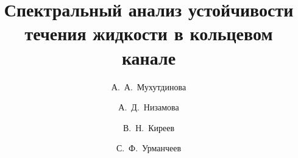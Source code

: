 

\usepackage{todonotes} %

\usepackage[russian]{nla}

%
%


%




%
\fi

\title{Спектральный анализ устойчивости течения жидкости в кольцевом канале}
\author{А.~А.~Мухутдинова  %
  \and  %
  А.~Д.~Низамова
  \and
	В.~Н.~Киреев
  \and
	С.~Ф.~Урманчеев
} %


\maketitle

